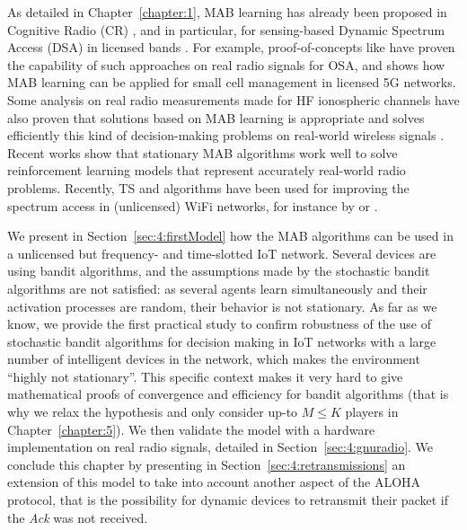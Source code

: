 As detailed in Chapter~\ref{chapter:1},
MAB learning has already been proposed in Cognitive Radio (CR) \cite{Mitola99,Haykin05}, and in particular, for sensing-based Dynamic Spectrum Access (DSA) in licensed bands \cite{Jouini10}.
For example,
proof-of-concepts like \cite{kumar2016two} have proven the capability of such approaches on real radio signals for OSA,
and \cite{Maghsudi16} shows how MAB learning can be applied for small cell management in licensed 5G networks.
Some analysis on real radio measurements made for HF ionospheric channels have also proven that solutions based on MAB learning is appropriate and solves efficiently this kind of decision-making problems on real-world wireless signals \cite{Melian15}.
Recent works show that stationary MAB algorithms work well to solve reinforcement learning models that represent accurately real-world radio problems.
Recently, TS and \UCB{} algorithms have been used for improving the spectrum access in (unlicensed) WiFi networks, for instance by \cite{Toldov16} or \cite{Wilhelmi19collaborative,Wilhelmi19potential}.

We present in Section~\ref{sec:4:firstModel} how the MAB algorithms can be used in a unlicensed but frequency- and time-slotted IoT network.
Several devices are using bandit algorithms, and the assumptions made by the stochastic bandit algorithms are not satisfied: as several agents learn simultaneously and their activation processes are random, their behavior is not stationary.
As far as we know, we provide the first practical study to confirm robustness of the use of stochastic bandit algorithms for decision making in IoT networks with a large number of intelligent devices in the network, which makes the environment ``highly not stationary''.
This specific context makes it very hard to give mathematical proofs of  convergence and efficiency for bandit algorithms (that is why we relax the hypothesis and only consider up-to $M \leq K$ players in Chapter~\ref{chapter:5}).
We then validate the model with a hardware implementation on real radio signals, detailed in Section~\ref{sec:4:gnuradio}.
%
We conclude this chapter by presenting in Section~\ref{sec:4:retransmissions} an extension of this model to take into account another aspect of the ALOHA protocol, that is the possibility for dynamic devices to retransmit their packet if the \emph{Ack} was not received.


